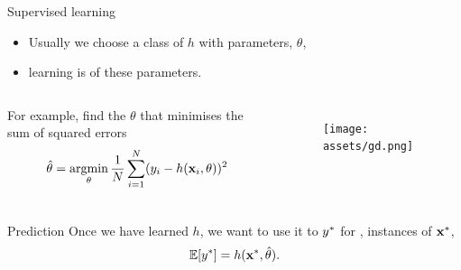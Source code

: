 \documentclass[lualatex, aspectratio=169]{beamer}
\begin{document}
\begin{frame}{Supervised learning}
  \begin{itemize}
    \item Usually we choose a class of $h$ with parameters, $\theta$,
    \item learning is  of these parameters.
  \end{itemize}

  
  \begin{columns}
    \column{0.51\pagewidth}
    For example, find the $\theta$ that minimises the sum of squared errors
    \begin{align*}
      \hat\theta = \argmin_{\theta} \frac{1}{N} \sum^N_{i=1} (y_i - h(\v{x}_i, \theta))^2
    \end{align*}
    \column{0.3\pagewidth}
    \begin{figure}
      \texttt{[image: assets/gd.png]}
    \end{figure}
  \end{columns}

\end{frame}


\begin{frame}{Prediction}
  Once we have learned $h$, we want to use it to  ${y}^{*}$ for ,  instances of ${\mathbf{x}}^{*}$,
  \begin{align*}
    \mathbb{E}\!\left[{{y}^{*}}\right] = h({\mathbf{x}}^{*}, \hat{\theta}).
  \end{align*}
\end{frame}
\end{document}

